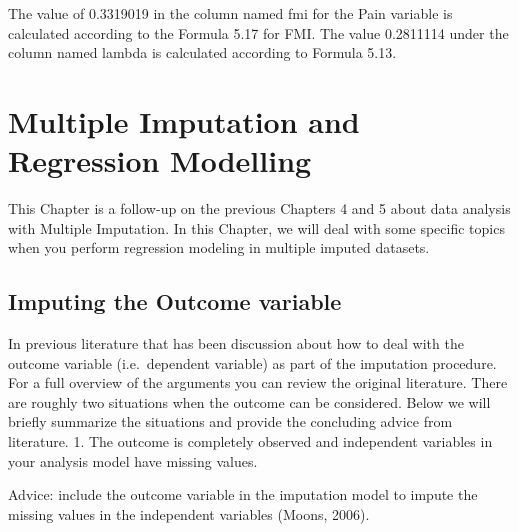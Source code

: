 \documentclass[]{book}
\newenvironment{Shaded}{\begin{snugshade}}{\end{snugshade}}
\newcommand{\CommentTok}[1]{\textcolor[rgb]{0.56,0.35,0.01}{\textit{#1}}}
\theoremstyle{definition}
\theoremstyle{definition}
\theoremstyle{definition}
\theoremstyle{remark}
\begin{document}
\begin{Shaded}
\end{Shaded}

The value of 0.3319019 in the column named fmi for the Pain variable is
calculated according to the Formula 5.17 for FMI. The value 0.2811114
under the column named lambda is calculated according to Formula 5.13.

\chapter{Multiple Imputation and Regression
Modelling}\label{multiple-imputation-and-regression-modelling}

This Chapter is a follow-up on the previous Chapters 4 and 5 about data
analysis with Multiple Imputation. In this Chapter, we will deal with
some specific topics when you perform regression modeling in multiple
imputed datasets.

\section{Imputing the Outcome
variable}\label{imputing-the-outcome-variable}

In previous literature that has been discussion about how to deal with
the outcome variable (i.e.~dependent variable) as part of the imputation
procedure. For a full overview of the arguments you can review the
original literature. There are roughly two situations when the outcome
can be considered. Below we will briefly summarize the situations and
provide the concluding advice from literature. 1. The outcome is
completely observed and independent variables in your analysis model
have missing values.

Advice: include the outcome variable in the imputation model to impute
the missing values in the independent variables (Moons, 2006).
\end{document}
